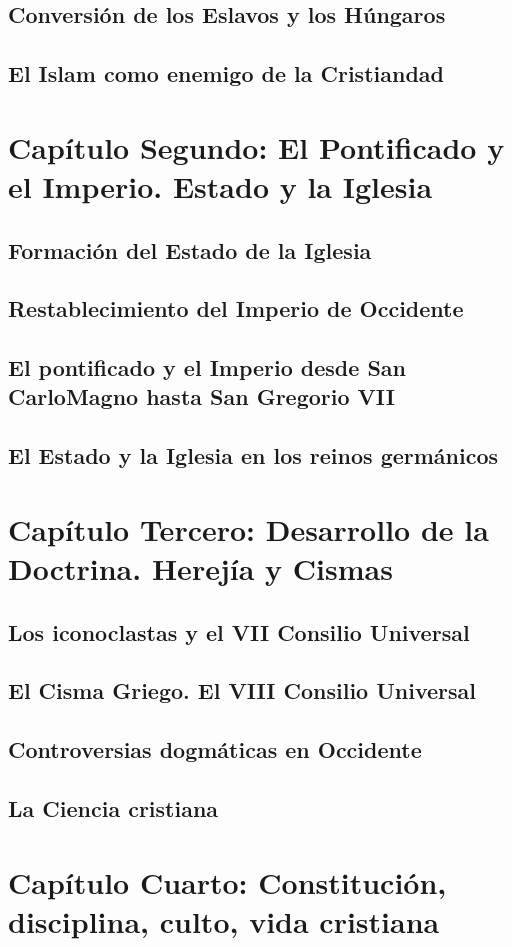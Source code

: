 \raggedbottom{} \documentclass[12pt]{book}
\begin{document}
\section{Conversión de los Eslavos y los Húngaros}
\section{El Islam como enemigo de la Cristiandad}
\chapter{Capítulo Segundo: El Pontificado y el Imperio. Estado y la Iglesia}
\section{Formación del Estado de la Iglesia}
\section{Restablecimiento del Imperio de Occidente}
\section{El pontificado y el Imperio desde San CarloMagno hasta San Gregorio VII}
\section{El Estado y la Iglesia en los reinos germánicos}
\chapter{Capítulo Tercero: Desarrollo de la Doctrina. Herejía y Cismas}
\section{Los iconoclastas y el VII Consilio Universal}
\section{El Cisma Griego. El VIII Consilio Universal}
\section{Controversias dogmáticas en Occidente}
\section{La Ciencia cristiana}
\chapter{Capítulo Cuarto: Constitución, disciplina, culto, vida cristiana}
\end{document}
